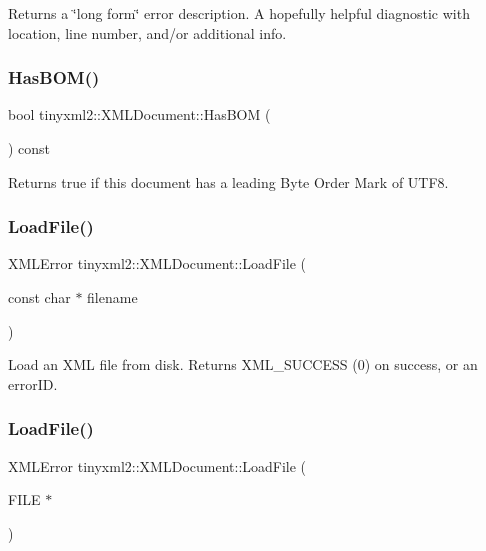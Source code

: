 Returns a \char`\"{}long form\char`\"{} error description. A hopefully helpful diagnostic with location, line number, and/or additional info. \mbox{\label{classtinyxml2_1_1XMLDocument_a33fc5d159db873a179fa26338adb05bd}} 
\subsubsection{\texorpdfstring{HasBOM()}{HasBOM()}}
{\footnotesize\ttfamily bool tinyxml2\+::\+X\+M\+L\+Document\+::\+Has\+B\+OM (\begin{DoxyParamCaption}{ }\end{DoxyParamCaption}) const\hspace{0.3cm}{\ttfamily [inline]}}

Returns true if this document has a leading Byte Order Mark of U\+T\+F8. \mbox{\label{classtinyxml2_1_1XMLDocument_a2ebd4647a8af5fc6831b294ac26a150a}} 
\subsubsection{\texorpdfstring{LoadFile()}{LoadFile()}\hspace{0.1cm}{\footnotesize\ttfamily [1/2]}}
{\footnotesize\ttfamily X\+M\+L\+Error tinyxml2\+::\+X\+M\+L\+Document\+::\+Load\+File (\begin{DoxyParamCaption}\item[{const char $\ast$}]{filename }\end{DoxyParamCaption})}

Load an X\+ML file from disk. Returns X\+M\+L\+\_\+\+S\+U\+C\+C\+E\+SS (0) on success, or an error\+ID. \mbox{\label{classtinyxml2_1_1XMLDocument_a5f1d330fad44c52f3d265338dd2a6dc2}} 
\subsubsection{\texorpdfstring{LoadFile()}{LoadFile()}\hspace{0.1cm}{\footnotesize\ttfamily [2/2]}}
{\footnotesize\ttfamily X\+M\+L\+Error tinyxml2\+::\+X\+M\+L\+Document\+::\+Load\+File (\begin{DoxyParamCaption}\item[{F\+I\+LE $\ast$}]{ }\end{DoxyParamCaption})}

